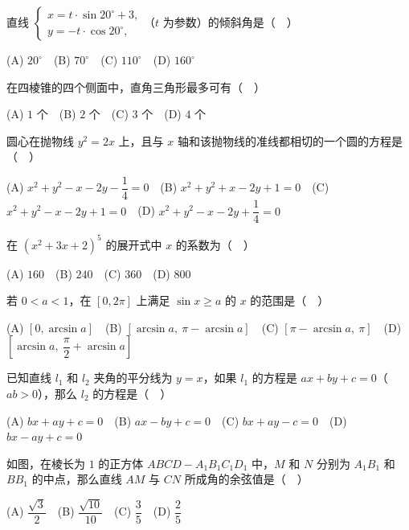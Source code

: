 \begin{question}
直线 \(\begin{cases}x=t\cdot\sin 20^{\circ}+3,\\ y=-t\cdot\cos 20^{\circ},\end{cases}\)（\(t\) 为参数）的倾斜角是（　）

(A) \(20^{\circ}\)　(B) \(70^{\circ}\)　(C) \(110^{\circ}\)　(D) \(160^{\circ}\)

\end{question}
\begin{question}
在四棱锥的四个侧面中，直角三角形最多可有（　）

(A) \(1\) 个　(B) \(2\) 个　(C) \(3\) 个　(D) \(4\) 个

\end{question}
\begin{question}
圆心在抛物线 \(y^{2}=2x\) 上，且与 \(x\) 轴和该抛物线的准线都相切的一个圆的方程是（　）

(A) \(x^{2}+y^{2}-x-2y-\dfrac{1}{4}=0\)　(B) \(x^{2}+y^{2}+x-2y+1=0\)　(C) \(x^{2}+y^{2}-x-2y+1=0\)　(D) \(x^{2}+y^{2}-x-2y+\dfrac{1}{4}=0\)

\end{question}
\begin{question}
在 \((x^{2}+3x+2)^{5}\) 的展开式中 \(x\) 的系数为（　）

(A) \(160\)　(B) \(240\)　(C) \(360\)　(D) \(800\)

\end{question}
\begin{question}
若 \(0<a<1\)，在 \([0,2\pi]\) 上满足 \(\sin x\geqslant a\) 的 \(x\) 的范围是（　）

(A) \([0,\arcsin a]\)　(B) \([\arcsin a,\ \pi-\arcsin a]\)　(C) \([\pi-\arcsin a,\ \pi]\)　(D) \(\left[\arcsin a,\ \dfrac{\pi}{2}+\arcsin a\right]\)

\end{question}
\begin{question}
已知直线 \(l_1\) 和 \(l_2\) 夹角的平分线为 \(y=x\)，如果 \(l_1\) 的方程是 \(ax+by+c=0\)（\(ab>0\)），那么 \(l_2\) 的方程是（　）

(A) \(bx+ay+c=0\)　(B) \(ax-by+c=0\)　(C) \(bx+ay-c=0\)　(D) \(bx-ay+c=0\)

\Needspace{0.4\textheight}
\end{question}
\begin{question}
如图，在棱长为 \(1\) 的正方体 \(ABCD-A_1B_1C_1D_1\) 中，\(M\) 和 \(N\) 分别为 \(A_1B_1\) 和 \(BB_1\) 的中点，那么直线 \(AM\) 与 \(CN\) 所成角的余弦值是（　）
\nopagebreak[4]
\begin{center}\end{center}
\nopagebreak[4]
(A) \(\dfrac{\sqrt{3}}{2}\)　(B) \(\dfrac{\sqrt{10}}{10}\)　(C) \(\dfrac{3}{5}\)　(D) \(\dfrac{2}{5}\)

\end{question}
